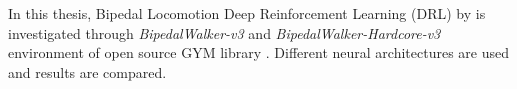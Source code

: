 In this thesis, Bipedal Locomotion Deep Reinforcement Learning (DRL) by is investigated through \textit{BipedalWalker-v3} \cite{noauthor_bipedalwalker-v2_2021} and \textit{BipedalWalker-Hardcore-v3} \cite{noauthor_bipedalwalkerhardcore-v2_2021} environment of open source GYM library \cite{brockman_openai_2016}. Different neural architectures are used and results are compared. 
